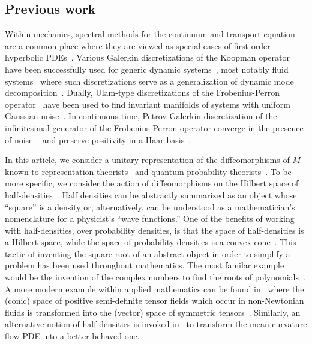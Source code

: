 \documentclass[final,leqno]{siamart}
\begin{document}
\subsection{Previous work}
Within mechanics, spectral methods for the continuum and transport equation are a common-place where they are viewed as special cases of first order hyperbolic PDEs~\cite{Boyd2001,Gottlieb2001}.
Various Galerkin discretizations of the Koopman operator have been successfully used for generic dynamic systems~\cite{BudisicMohrMezic2012,Mezic2005}, most notably fluid systems~\cite{Rowley2009} where such discretizations serve as a generalization of dynamic mode decomposition~\cite{Schmid2010}.
Dually, Ulam-type discretizations of the Frobenius-Perron operator~\cite{LasotaMackey1994,Ulam1947} have been used to find invariant manifolds of systems with uniform Gaussian noise~\cite{FroylandJungeKoltai2013,FroylandPadberg2009}.
In continuous time, Petrov-Galerkin discretization of the infinitesimal generator of the Frobenius Perron operator converge in the presence of noise ~\cite{BittracherKoltaiJunge2015} and preserve positivity in a Haar basis~\cite{koltai2011thesis}.

In this article, we consider a unitary representation of the diffeomorphisms of $M$ known to representation theorists~\cite{Ismagilov1975,VershilGelfandGraev1975} and quantum probability theorists~\cite{Meyer1998,Parthasarathy2012}.
To be more specific, we consider the action of diffeomorphisms on the Hilbert space of half-densities~\cite{BatesWeinstein1997,GuilleminSternberg1970}.
Half densities can be abstractly summarized as an object whose ``square'' is a density
or, alternatively, can be understood as a mathematician's nomenclature for a physicist's ``wave functions.''
One of the benefits of working with half-densities, over probability densities, is that the space of half-densities is a Hilbert space, while the space of probability densities is a convex cone~\cite{GuilleminSternberg1970}.
This tactic of inventing the square-root of an abstract object in order to simplify a problem has been used throughout mathematics.
The most familar example would be the invention of the complex numbers to find the roots of polynomials~\cite{Stewart2015}.
A more modern example within applied mathematics can be found in~\cite{Balci2011} where the (conic) space of positive semi-definite tensor fields which occur in non-Newtonian fluids is transformed into the (vector) space of symmetric tensors~\cite{Balci2011}.
Similarly, an alternative notion of half-densities is invoked in~\cite{Crane2013} to transform the mean-curvature flow PDE into a better behaved one.
\end{document}
